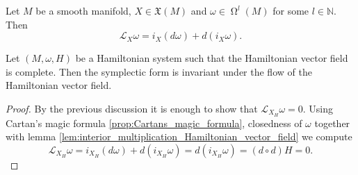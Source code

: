 \begin{proposition}
	\label{prop:Cartans_magic_formula}
	Let $M$ be a smooth manifold, $X \in \mathfrak{X}(M)$ and $\omega \in \upOmega^l(M)$ for some $l \in \mathbb{N}$. Then
	\begin{equation*}
		\mathcal{L}_X\omega = i_X(d\omega) + d(i_X\omega).
	\end{equation*}
\end{proposition}

\begin{proposition}
	Let $(M,\omega,H)$ be a Hamiltonian system such that the Hamiltonian vector field is complete. Then the symplectic form is invariant under the flow of the Hamiltonian vector field.
\end{proposition}

\begin{proof}
	By the previous discussion it is enough to show that $\mathcal{L}_{X_H}\omega = 0$. Using Cartan's magic formula \ref{prop:Cartans_magic_formula}, closedness of $\omega$ together with lemma \ref{lem:interior_multiplication_Hamiltonian_vector_field} we compute
	\begin{equation*}
		\mathcal{L}_{X_H}\omega = i_{X_H}(d\omega) + d(i_{X_H}\omega) = d(i_{X_H}\omega) = (d \circ d)H = 0.
	\end{equation*}
\end{proof}


